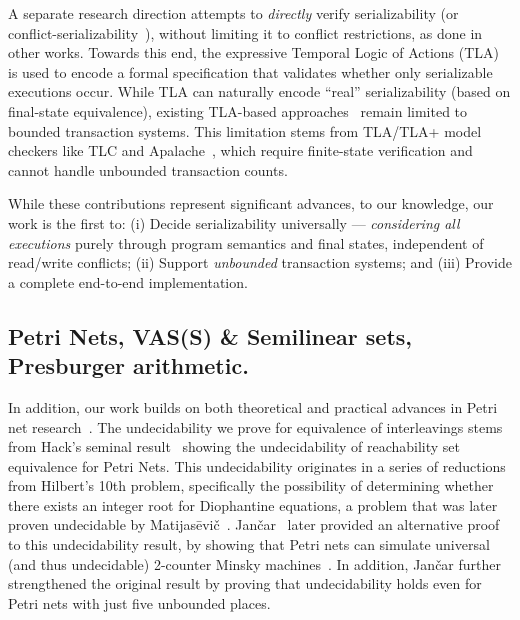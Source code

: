 A separate research direction attempts to \textit{directly} verify serializability (or conflict-serializability~\cite{CoOlPnTuZu07}), without limiting it to conflict restrictions, as done in other works. Towards this end, the expressive Temporal Logic of Actions (TLA)~\cite{La94} is used to encode a formal specification that validates whether only serializable executions occur. While TLA can naturally encode ``real'' serializability (based on final-state equivalence), existing TLA-based approaches~\cite{SoVaVi20, Ho24} remain limited to bounded transaction systems. This limitation stems from TLA/TLA+ model checkers like TLC and Apalache~\cite{YuMaLa99, KoKuTr19}, which require finite-state verification and cannot handle unbounded transaction counts.

%
While these contributions represent significant advances, to our knowledge, our work is the first to:
(i) Decide serializability universally --- \textit{considering all executions} purely through program semantics and final states, independent of read/write conflicts; 
(ii) Support \textit{unbounded} transaction systems; and
(iii) Provide a complete end-to-end implementation.

\subsection{Petri Nets, VAS(S) \& Semilinear sets, Presburger arithmetic.}
\label{sec:related:petri}


In addition, our work builds on both theoretical and practical advances in Petri net research~\cite{Mu89, Es96, Re12, EsNi24}. The undecidability we prove for equivalence of interleavings stems from Hack’s seminal result~\cite{Ha76, HaThesis76} showing the undecidability of reachability set equivalence for Petri Nets. This undecidability originates in a series of reductions from Hilbert’s 10th problem, specifically the possibility of determining whether there exists an integer root for Diophantine equations, a problem that was later proven undecidable by Matijasēvič~\cite{Ma70}.
%
Jančar~\cite{Ja95} later provided an alternative proof to this undecidability result, by showing that Petri nets can simulate universal (and thus undecidable) 2-counter Minsky machines~\cite{Mi67}. In addition, Jančar further strengthened the original result by proving that undecidability holds even for Petri nets with just five unbounded places.

